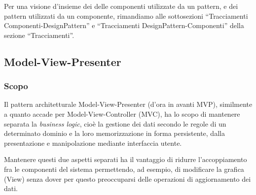 Per una visione d'insieme dei delle componenti utilizzate da un pattern, e dei pattern utilizzati da un componente, rimandiamo alle sottosezioni ``Tracciamenti Componenti-DesignPattern'' e ``Tracciamenti DesignPattern-Componenti'' della sezione ``Tracciamenti''.


\subsection{Model-View-Presenter}

\subsubsection{Scopo}
Il pattern architetturale \foreignlanguage{english}{Model-View-Presenter} (d'ora in avanti MVP), similmente a quanto accade per \foreignlanguage{english}{Model-View-Controller} (MVC), ha lo scopo di mantenere separata la \textit{business logic}, cioè la gestione dei dati secondo le regole di un determinato dominio e la loro memorizzazione in forma persistente, dalla presentazione e manipolazione mediante interfaccia utente.

Mantenere questi due aspetti separati ha il vantaggio di ridurre l'accoppiamento fra le componenti del sistema permettendo, ad esempio, di modificare la grafica (View) senza dover per questo preoccuparsi delle operazioni di aggiornamento dei dati.

